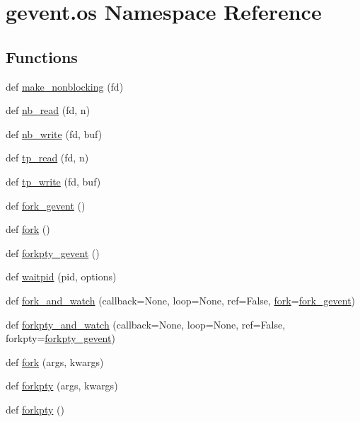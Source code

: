 \hypertarget{namespacegevent_1_1os}{}\section{gevent.\+os Namespace Reference}
\label{namespacegevent_1_1os}
\subsection*{Functions}
\begin{DoxyCompactItemize}
\item 
def \hyperlink{namespacegevent_1_1os_afda17326a86efe283deb154009b8aac9}{make\+\_\+nonblocking} (fd)
\item 
def \hyperlink{namespacegevent_1_1os_a2fb3b6b13b3e790a9a392746bd295ffb}{nb\+\_\+read} (fd, n)
\item 
def \hyperlink{namespacegevent_1_1os_a22d656b3256c18d0db846822e129eafb}{nb\+\_\+write} (fd, buf)
\item 
def \hyperlink{namespacegevent_1_1os_a49ed3c20a04f75267ee2fe251c4358a9}{tp\+\_\+read} (fd, n)
\item 
def \hyperlink{namespacegevent_1_1os_abda169fc047bb4cc04b25ea8f154aa7f}{tp\+\_\+write} (fd, buf)
\item 
def \hyperlink{namespacegevent_1_1os_a98835fac37df4bd17a1433f6c01daf6f}{fork\+\_\+gevent} ()
\item 
def \hyperlink{namespacegevent_1_1os_a7d22bcbe03e198e484217634c2611b7e}{fork} ()
\item 
def \hyperlink{namespacegevent_1_1os_a3e04fb5e868290aae691fd3a3a85a77e}{forkpty\+\_\+gevent} ()
\item 
def \hyperlink{namespacegevent_1_1os_a73d51adddb408a122bc8137102f54653}{waitpid} (pid, options)
\item 
def \hyperlink{namespacegevent_1_1os_a536e814c326f318e9bae710344de11d6}{fork\+\_\+and\+\_\+watch} (callback=None, loop=None, ref=False, \hyperlink{namespacegevent_1_1os_a7d22bcbe03e198e484217634c2611b7e}{fork}=\hyperlink{namespacegevent_1_1os_a98835fac37df4bd17a1433f6c01daf6f}{fork\+\_\+gevent})
\item 
def \hyperlink{namespacegevent_1_1os_a5115239646d7bd6a10bf4c24d07926b3}{forkpty\+\_\+and\+\_\+watch} (callback=None, loop=None, ref=False, forkpty=\hyperlink{namespacegevent_1_1os_a3e04fb5e868290aae691fd3a3a85a77e}{forkpty\+\_\+gevent})
\item 
def \hyperlink{namespacegevent_1_1os_a333943be729b41ab9ebc1402d8fb7992}{fork} (args, kwargs)
\item 
def \hyperlink{namespacegevent_1_1os_a0301570240bde65a58985e2b60e15535}{forkpty} (args, kwargs)
\item 
def \hyperlink{namespacegevent_1_1os_a050db0adfdcdc0616ac36b1d9874d494}{forkpty} ()
\end{DoxyCompactItemize}
